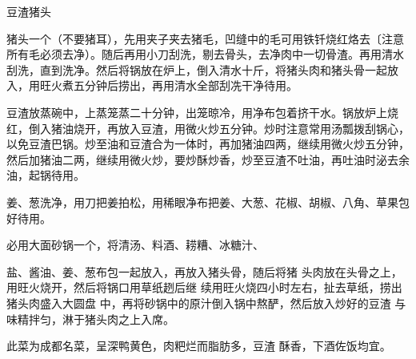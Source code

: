 \begin{recipe}{豆渣猪头}

\ingredients


\cooking

\step 猪头一个（不要猪耳），先用夹子夹去猪毛，凹缝中的毛可用铁钎烧红烙去〔注意所有毛必须去净）。随后再用小刀刮洗，剔去骨头，去净肉中一切骨渣。再用清水刮洗，直到洗净。然后将锅放在炉上，倒入清水十斤，将猪头肉和猪头骨一起放入，用旺火煮五分钟后捞出，再用清水全部刮冼干净待用。

\step 豆渣放蒸碗中，上蒸笼蒸二十分钟，出笼晾冷，用净布包着挤干水。锅放炉上烧红，倒入猪油烧开，再放入豆渣，用微火炒五分钟。炒时注意常用汤瓢拨刮锅心，以免豆渣巴锅。炒至油和豆渣合为一体时，再加猪油四两，继续用微火炒五分钟，然后加猪油二两，继续用微火炒，要炒酥炒香，炒至豆渣不吐油，再吐油时泌去余油，起锅待用。

\step 姜、葱洗净，用刀把姜拍松，用稀眼净布把姜、大葱、花椒、胡椒、八角、草果包好待用。

必用大面砂锅一个，将清汤、料酒、耢糟、冰糖汁、

盐、酱油、姜、葱布包一起放入，再放入猪头骨，随后将猪 头肉放在头骨之上，用旺火烧开，然后将锅口用草纸趔后继 续用旺火烧四小时左右，扯去草纸，捞出猪头肉盛入大圆盘 中，再将砂锅中的原汁倒入锅中熬酽，然后放入炒好的豆渣 与味精拌匀，淋于猪头肉之上入席。

\notes

此菜为成都名菜，呈深鸭黄色，肉粑烂而脂肪多，豆渣 酥香，下酒佐饭均宜。

\end{recipe}

